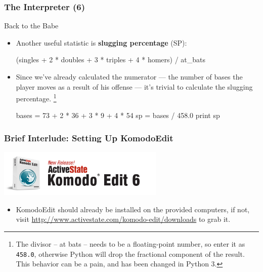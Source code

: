 \documentclass[10pt]{beamer}
\begin{document}
\begin{frame}[fragile]
  \frametitle{The Interpreter (6)}
  \begin{block}{Back to the Babe}
    \begin{itemize}
      \item Another useful statistic is \textbf{slugging percentage} (SP):    
      \footnotesize
      \begin{pythoncode}
  (singles + 2 * doubles + 3 * triples + 4 * homers) / at_bats
      \end{pythoncode}
      \normalsize
      \item Since we've already calculated the numerator --- the number of bases the player moves as a result of his offense --- it's trivial to calculate the slugging percentage.
      \footnote{The divisor -- at bats -- needs to be a floating-point number, so enter it as \texttt{458.0}, otherwise Python will drop the fractional component of the result.  This behavior can be a pain, and has been changed in Python 3.}
      \begin{pythoncode}
  bases = 73 + 2 * 36 + 3 * 9 + 4 * 54
  sp = bases / 458.0
  print sp
      \end{pythoncode}
    \end{itemize}
  \end{block}
\end{frame}

\begin{frame}
  \frametitle{Brief Interlude: Setting Up KomodoEdit}
  \begin{center}
    \includegraphics[width=300px]{KomodoEdit.png}
  \end{center}
  \begin{itemize}
    \item KomodoEdit should already be installed on the provided computers, if not, visit \href{http://www.activestate.com/komodo-edit/downloads}{http://www.activestate.com/komodo-edit/downloads} to grab it.
  \end{itemize}
\end{frame}
\end{document}

